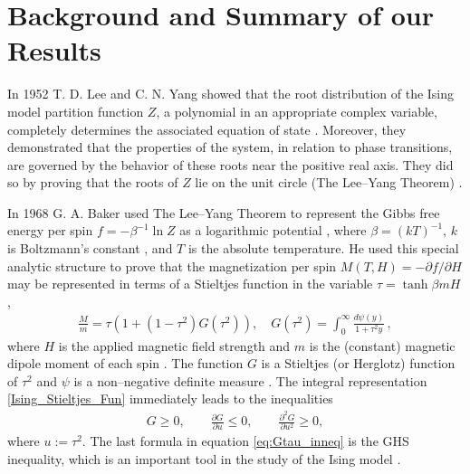 \documentclass[english,12pt,jmp,graphicx]{revtex4-1}
\begin{document}
\section{Background and Summary of our Results}\label{sec:Background}
%
In 1952 T. D. Lee and C. N. Yang showed that the root distribution of
the Ising model partition function $Z$, a polynomial in an appropriate
complex variable, completely determines the associated equation of
state \cite{Yang:PR:404}. Moreover, they demonstrated that the
properties of the system, in relation to phase transitions, are
governed by the behavior of these roots near the positive real
axis. They did so by proving that the roots of $Z$ lie on the unit
circle (The Lee--Yang Theorem) \cite{Lee:PR:411,Ruelle-1969}.  

In 1968 G. A. Baker used The Lee--Yang Theorem to represent the Gibbs
free energy per spin $f=-\beta^{-1}\ln{Z}$ as a logarithmic potential
\cite{Baker:PRL-990}, where $\beta=(kT)^{-1}$, $k$ is Boltzmann's constant
\cite{Thompson-1988}, and $T$ is the absolute temperature. He used
this special analytic structure to prove that the magnetization per
spin $M(T,H)=-\partial f/\partial H$ \cite{Robertson-1993} may be represented in terms
of a Stieltjes function in the variable $\tau=\tanh{\beta mH}$
\cite{Baker:PRL-990,Baker-1990},       
%
\begin{align}\label{Ising_Stieltjes_Fun}
  \frac{M}{m} =\tau(1+(1-\tau^2)G(\tau^2)), \quad
  G(\tau^2)=\int_0^\infty\frac{d\psi(y)}{1+\tau^2y}\,, %
\end{align}
%
where $H$ is the applied magnetic field strength and $m$ is the 
(constant) magnetic dipole moment of each spin
\cite{Griffiths-1999}. The function $G$ is a Stieltjes (or 
Herglotz) function of $\tau^2$ and $\psi$ is a non--negative definite
measure \cite{Baker:PRL-990}.  The integral representation
\eqref{Ising_Stieltjes_Fun} immediately leads to the inequalities   
%
\begin{align}\label{eq:Gtau_inneq}
  G\geq0, \qquad \frac{\partial G}{\partial u}\leq0, \qquad \frac{\partial^2G}{\partial u^2}\geq0,
\end{align}
%
where $u:=\tau^2$. The last formula in equation \eqref{eq:Gtau_inneq} is
the GHS inequality, which is an important tool in the study of the
Ising model \cite{Golden:JMP-5627}. 
\end{document}
